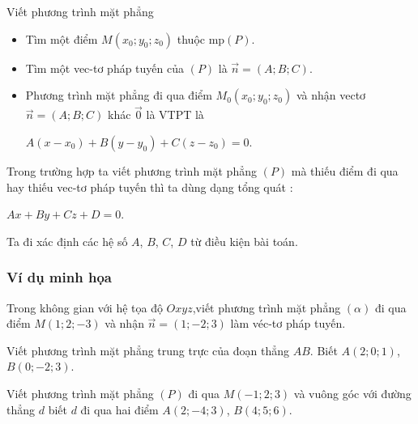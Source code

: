 \begin{dang}{Viết phương trình mặt phẳng}
\begin{itemize}
	\item Tìm  một điểm $M(x_0; y_0; z_0)$ thuộc mp$(P)$.
	\item Tìm một vec-tơ pháp tuyến của $\left(P \right)$ là $\overrightarrow{n}=(A;B;C)$.
	\item Phương trình mặt phẳng đi qua điểm $M_0(x_0;y_0;z_0)$ và nhận vectơ $\overrightarrow{n}=(A;B;C)$ khác $\overrightarrow{0}$ là VTPT là
\begin{center}
	$A(x-x_0)+B(y-y_0)+C(z-z_0)=0$.
\end{center}
	
\end{itemize}
\begin{note}
	Trong trường hợp ta viết phương trình mặt phẳng $(P)$ mà thiếu điểm đi qua hay thiếu vec-tơ pháp tuyến thì ta dùng dạng tổng quát : \begin{center}
		$Ax+By+Cz+D=0$.
	\end{center}
 Ta đi xác định các hệ số $A$, $B$, $C$, $D$ từ điều kiện bài toán.
\end{note}
\end{dang}
\setcounter{subsubsection}{0}
\setcounter{vd}{0}
\setcounter{bt}{0}
\setcounter{ex}{0}
\subsubsection{Ví dụ minh họa}
\begin{vd}%
	Trong không gian với hệ tọa độ $Oxyz$,viết phương trình  mặt phẳng $(\alpha)$ đi qua điểm $M(1;2;-3)$ và nhận $\vec{n}=(1;-2;3)$ làm véc-tơ pháp tuyến.
\end{vd}

\begin{vd}%
	Viết phương trình mặt phẳng trung trực của đoạn thẳng $AB$.
	Biết  $A(2;0;1)$, $B(0;-2;3)$. 
		
\end{vd}
\begin{vd}%
	Viết phương trình mặt phẳng $(P)$ đi qua $M(-1;2;3)$ và vuông góc với đường thẳng $d$ biết $d$ đi qua hai điểm $A(2;-4;3)$, $B(4;5;6)$.
\end{vd}

